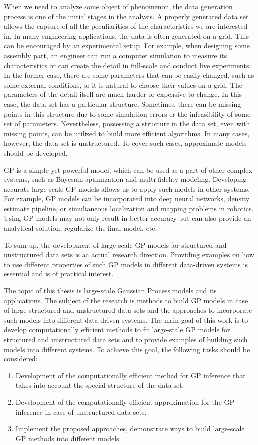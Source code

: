 When we need to analyze some object of phenomenon, the data generation process is one of the
initial stages in the analysis.
A properly generated data set allows the capture of all the peculiarities of
the characteristics we are interested in.
In many engineering applications, the data is often generated on a grid.
This can be encouraged by an experimental setup.
For example, when designing some assembly part, an engineer can run a computer simulation
to measure its characteristics or can create the detail in full-scale
and conduct live experiments.
In the former case, there are some parameters that can be easily changed,
such as some external conditions, so it is natural to choose their values on a grid.
The parameters of the detail itself are much harder or expensive to change.
In this case, the data set has a particular structure.
Sometimes, there can be missing points in this structure due
to some simulation errors or the infeasibility of some set of parameters.
Nevertheless, possessing a structure in the data set, even with missing points,
can be utilized to build more efficient algorithms.
In many cases, however, the data set is unstructured.
To cover such cases, approximate models should be developed.

GP is a simple yet powerful model, which can be used
as a part of other complex systems, such as Bayesian optimization and
multi-fidelity modeling.
Developing accurate large-scale GP models allows us to
apply such models in other systems.
For example, GP models can be incorporated into deep neural networks,
density estimate pipeline, or simultaneous localization and mapping
problems in robotics.
Using GP models may not only result in better accuracy
but can also provide an analytical solution, regularize the final model, etc.

To sum up, the development of large-scale GP models for
structured and unstructured data sets is an actual research direction.
Providing examples on how to use different properties of such GP models
in different data-driven systems is essential and is of practical interest.

The topic of this thesis is large-scale Gaussian Process models
and its applications.
The subject of the research is
methods to build GP models in case of large structured and unstructured data sets
and the approaches to incorporate such models into different data-driven systems.
The main goal of this work is to develop computationally efficient
methods to fit large-scale GP models for structured and unstructured data sets
and to provide examples of building such models into different systems.
To achieve this goal, the following tasks should be considered:
\begin{enumerate}
    \item Development of the computationally efficient method for GP inference
    that takes into account the special structure of the data set.
    \item Development of the computationally efficient approximation for the GP inference
    in case of unstructured data sets.
    \item Implement the proposed approaches, demonstrate ways to build large-scale GP methods into different models.
\end{enumerate}

